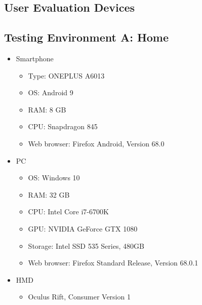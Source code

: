 
\begin{appendices}
  \chapter{User Evaluation Devices}\label{chapter:append-user-eval-devices}
  \section{Testing Environment A: Home}
  \begin{itemize}
    \item Smartphone
    \begin{itemize}
      \item Type: ONEPLUS A6013
      \item \ac{OS}: Android 9
      \item RAM: 8 GB
      \item CPU: Snapdragon 845 %
      \item Web browser: Firefox Android, Version 68.0
    \end{itemize}
    \item \ac{PC}
    \begin{itemize}
      \item \ac{OS}: Windows 10
      \item RAM: 32 GB
      \item CPU: Intel Core i7-6700K %
      \item GPU: NVIDIA GeForce GTX 1080
      \item Storage: Intel SSD 535 Series, 480GB
      \item Web browser: Firefox Standard Release, Version 68.0.1
    \end{itemize}
    \item \ac{HMD}
    \begin{itemize}
      \item Oculus Rift, Consumer Version 1
    \end{itemize}
  \end{itemize}

  \filbreak{}

\end{appendices}
